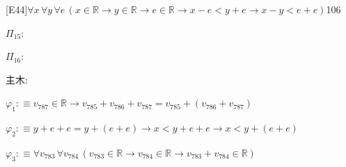 \begin{fullproof}{[E44]}{$\forall x\,\forall y\,\forall e\,(x \in \mathbb{R} \to y \in \mathbb{R} \to e \in \mathbb{R} \to x - e < y + e \to x - y < e + e)$}{106}
\begin{ptree}
\end{ptree}
\noindent$\Pi_{15}$:
\begin{ptree}
\noLine
{}
\end{ptree}
\noindent$\Pi_{16}$:
\begin{ptree}
\noLine
{}
\noLine
{}
\end{ptree}
\noindent 主木:
\begin{ptree}
\noLine
{}
\noLine
{}
\noLine
{}
\noLine
{}
\end{ptree}
\begin{abbrevlist}
\item $\varphi_{1} :\equiv v_{787} \in \mathbb{R} \to v_{785} + v_{786} + v_{787} = v_{785} + (v_{786} + v_{787})$
\item $\varphi_{2} :\equiv y + e + e = y + (e + e) \to x < y + e + e \to x < y + (e + e)$
\item $\varphi_{3} :\equiv \forall v_{783}\,\forall v_{784}\,(v_{783} \in \mathbb{R} \to v_{784} \in \mathbb{R} \to v_{783} + v_{784} \in \mathbb{R})$

\end{abbrevlist}
\end{fullproof}
